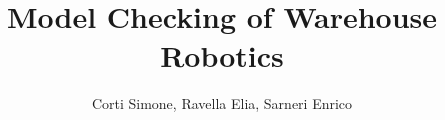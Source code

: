 \documentclass[10pt,a4paper]{article}
\title{Model Checking of Warehouse Robotics}
\author{Corti Simone, Ravella Elia, Sarneri Enrico}
\begin{document}
	\begin{titlepage}
		\maketitle
	\end{titlepage}
	
	
\end{document}
